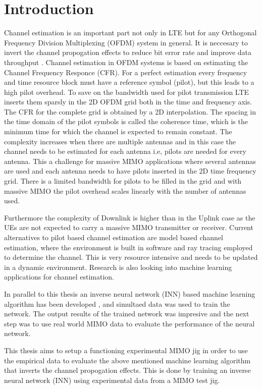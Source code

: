 \chapter{Introduction}
\label{ch:intro}

Channel estimation is an important part not only in LTE but for any Orthogonal Frequency Division Multiplexing (OFDM) system in general. It is neccesary to invert the channel propogation effects to reduce bit error rate and improve data throughput \cite{ChEst,CHEstPilotBased}. Channel estimation in OFDM systems is based on estimating the Channel Frequency Responce (CFR). For a perfect estimation every frequency and time resource block must have a reference symbol (pilot), but this leads to a high pilot overhead. To save on the bandwidth used for pilot transmission LTE inserts them sparsly in the 2D OFDM grid both in the time and frequency axis. The CFR for the complete grid is obtained by a 2D interpolation. The spacing in the time domain of the pilot symbols is called the coherence time, which is the minimum time for which the channel is expected to remain constant. The complexity increases when there are multiple antennas and in this case the channel needs to be estimated for each antenna i.e, pilots are needed for every antenna. This a challenge for massive MIMO applications where several antennas are used and each antenna needs to have pilots inserted in the 2D time frequency grid. There is a limited bandwidth for pilots to be filled in the grid and with massive MIMO the pilot overhead scales linearly with the number of antennas used.

Furthermore the complexity of Downlink is higher than in the Uplink case as the UEs are not expected to carry a massive MIMO transmitter or receiver. Current alternatives to pilot based channel estimation are model based channel estimation, where the environment is built in software and ray tracing employed to determine the channel. This is very resource intensive and needs to be updated in a dynamic environment. Research is also looking into machine learning applications for channel estimation. 

In parallel to this thesis an inverse neural network (INN) based machine learning algorithm has been developed \cite{JMMLINN}, and simultaed data was used to train the network. The output results of the trained network was impresive and the next step was to use real world MIMO data to evaluate the performance of the neural network.

This thesis aims to setup a functioning experimental MIMO jig in order to use the empirical data to evaluate the above mentioned machine learning algorithm that inverts the channel propogation effects. This is done by training an inverse neural network (INN) using experimental data from a MIMO test jig.

